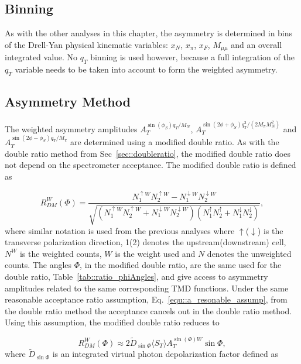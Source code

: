\subsection{Binning}
As with the other analyses in this chapter, the asymmetry is determined in bins
of the Drell-Yan physical kinematic variables: $x_N$, $x_\pi$, $x_F$,
$M_{\mu\mu}$ and an overall integrated value.  No $q_T$ binning is used however,
because a full integration of the $q_T$ variable needs to be taken into account
to form the weighted asymmetry.

\subsection{Asymmetry Method}
The weighted asymmetry amplitudes $A_T^{\sin(\phi_S) q_T/M_N}$,
$A_T^{\sin(2\phi+\phi_S) q^3_T/(2M_{\pi}M_N^2)}$ and $A_T^{\sin(2\phi-\phi_S)
  q_T/M_{\pi}}$ are determined using a modified double ratio.  As with the
double ratio method from Sec~\ref{sec::doubleratio}, the modified double ratio
does not depend on the spectrometer acceptance.  The modified double ratio is
defined as

\begin{equation}
  \label{equ::modified_dr}
  R^W_{DM}(\Phi)=
  \frac{N^{\uparrow W}_{1}N^{\uparrow W}_{2}
    - N^{\downarrow W}_{1}N^{\downarrow W}_{2}}
       {\sqrt{(N^{\uparrow W}_{1}N^{\uparrow W}_{2}
         + N^{\downarrow W}_{1}N^{\downarrow W}_{2})
         (N^{\uparrow}_{1}N^{\uparrow}_{2}
         + N^{\downarrow}_{1}N^{\downarrow}_{2})}},
\end{equation}
\noindent
where similar notation is used from the previous analyses where
$\uparrow$($\downarrow$) is the transverse polarization direction, 1(2) denotes
the upstream(downstream) cell, $N^{W}$ is the weighted counts, $W$ is the weight
used and $N$ denotes the unweighted counts.  The angles $\Phi$, in the modified
double ratio, are the same used for the double ratio,
Table~\ref{tab::ratio_phiAngles}, and give access to asymmetry amplitudes
related to the same corresponding TMD functions.  Under the same reasonable
acceptance ratio assumption, Eq.~\ref{equ::a_resonable_assump}, from the double
ratio method the acceptance cancels out in the double ratio method.  Using this
assumption, the modified double ratio reduces to

\begin{equation}
  \label{equ::dr_fit_form}
  R^W_{DM}(\Phi) \approx 2 \tilde{D}_{\sin\Phi}\langle S_T \rangle
  A_T^{\sin(\Phi)W} \sin\Phi,
\end{equation}
\noindent
where $\tilde{D}_{\sin\Phi}$ is an integrated virtual photon depolarization
factor defined as

